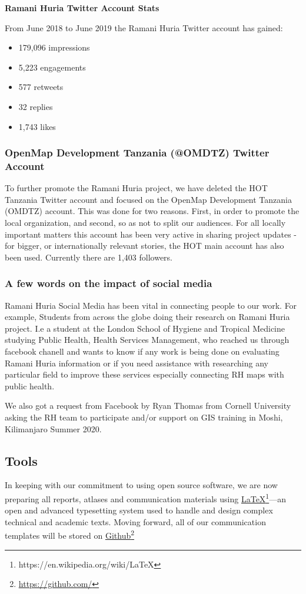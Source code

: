 \documentclass[a4paper,12pt,twoside]{article}
\begin{document}
\textbf{Ramani Huria Twitter Account Stats} 

From June 2018 to June 2019 the Ramani Huria Twitter account has gained:
\begin{itemize}
    \item 179,096 impressions
    \item 5,223 engagements
    \item 577 retweets
    \item 32 replies
    \item 1,743 likes
\end{itemize}

\subsubsection{OpenMap Development Tanzania (@OMDTZ) Twitter Account}  
To further promote the Ramani Huria project,  we have deleted the HOT Tanzania Twitter account and focused on the OpenMap Development Tanzania (OMDTZ) account. This was done for two reasons. First, in order to promote the local organization, and second, so as not to split our audiences. For all locally important matters this account has been very active in sharing project updates - for bigger, or internationally relevant stories, the HOT main account has also been used. Currently there are 1,403 followers. 


\subsubsection{A few words on the impact of social media}
Ramani Huria Social Media has been vital in connecting people to our work. For example, Students from across the globe doing their research on Ramani Huria project. I.e a student at the London School of Hygiene and Tropical Medicine studying Public Health, Health Services Management, who reached us through facebook chanell and wants to know if any work is being done on evaluating Ramani Huria information or if you need assistance with researching any particular field to improve these services especially connecting RH maps with public health.

We also got a request from Facebook by Ryan Thomas from Cornell University asking the RH team to participate and/or support on GIS training in Moshi, Kilimanjaro Summer 2020.

\subsection{Tools}
In keeping with our commitment to using open source software, we are now preparing all reports, atlases and communication materials using \href{https://en.wikipedia.org/wiki/LaTeX}{\LaTeX{}\footnote{\url{https://en.wikipedia.org/wiki/LaTeX}}}---an open and  advanced typesetting system used to handle and design complex technical and academic texts. Moving forward, all of our communication templates will be stored on \href{https://github.com/}{Github}\footnote{\url{https://github.com/}} 
\end{document}
